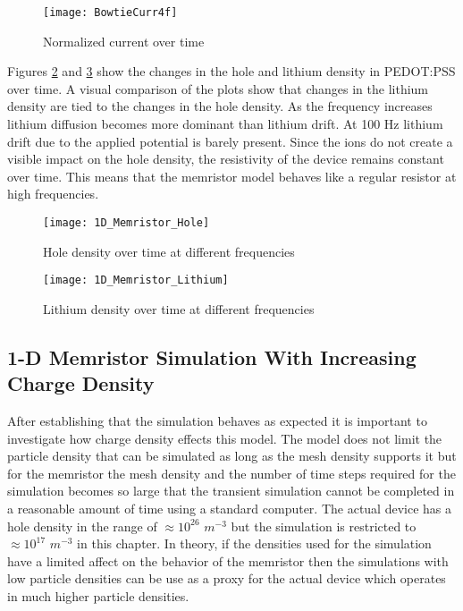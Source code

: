 \begin{doublespace}
\begin{figure}[!htp]
\centering
\texttt{[image: BowtieCurr4f]}
\caption{Normalized current over time} 
\label{BowtieCurr}
\end{figure}

Figures \ref{Bowhole} and \ref{Bowli} show the changes in the hole and lithium density in PEDOT:PSS over time. A visual comparison of the plots show that changes in the lithium density are tied to the changes in the hole density. As the frequency increases lithium diffusion becomes more dominant than lithium drift. At 100 Hz lithium drift due to the applied potential is barely present. Since the ions do not create a visible impact on the hole density, the resistivity of the device remains constant over time. This means that the memristor model behaves like a regular resistor at high frequencies.


\begin{figure}[!htp]
\centering
\texttt{[image: 1D\_Memristor\_Hole]}
\caption{Hole density over time at different frequencies} 
\label{Bowhole}
\end{figure}

\begin{figure}[!htp]
\centering
\texttt{[image: 1D\_Memristor\_Lithium]}
\caption{Lithium density over time at different frequencies} 
\label{Bowli}
\end{figure}


\clearpage
\subsection{1-D Memristor Simulation With Increasing Charge Density}

After establishing that the simulation behaves as expected it is important to investigate how charge density effects this model. The model does not limit the particle density that can be simulated as long as the mesh density supports it but for the memristor the mesh density and the number of time steps required for the simulation becomes so large that the transient simulation cannot be completed in a reasonable amount of time using a standard computer. The actual device has a hole density in the range of $ \approx 10^{26}$ $m^{-3}$ but the simulation is restricted to $\approx 10^{17}$ $m^{-3}$ in this chapter. In theory, if the densities used for the simulation  have a limited affect on the behavior of the memristor then the simulations with low particle densities can be use as a proxy for the actual device which operates in much higher particle densities.


\end{doublespace}
